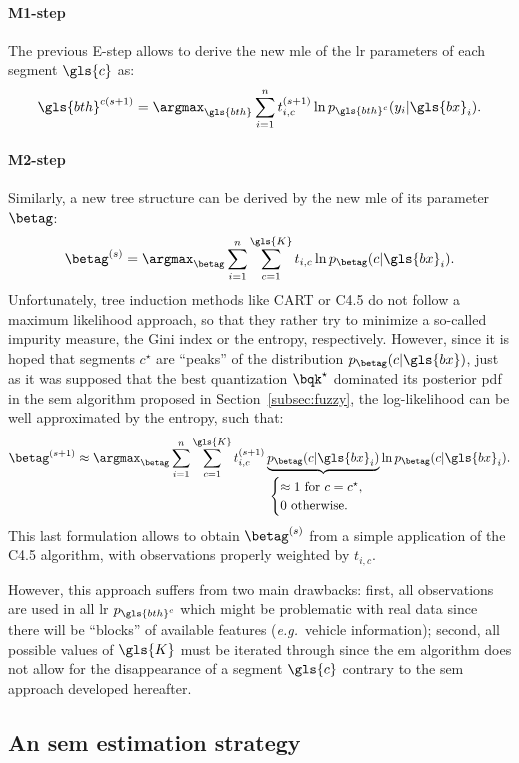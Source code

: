 \paragraph{M1-step}
The previous E-step allows to derive the new \gls{mle} of the \gls{lr} parameters of each segment $\gls{c}$ as:
\[ \gls{bth}^{c(s+1)} = \argmax_{\gls{bth}} \sum_{i=1}^n t_{i,c}^{(s+1)} \ln p_{\gls{bth}^c}(y_i | \gls{bx}_i). \]

\paragraph{M2-step}
Similarly, a new tree structure can be derived by the new \gls{mle} of its parameter $\betag$:
\[ \betag^{(s)} = \argmax_{\betag} \sum_{i=1}^n \sum_{c=1}^{\gls{K}} t_{i,c} \ln p_{\betag}( c | \gls{bx}_i). \]
Unfortunately, tree induction methods like CART or C4.5 do not follow a maximum likelihood approach, so that they rather try to minimize a so-called impurity measure, the Gini index or the entropy, respectively. However, since it is hoped that segments $c^\star$ are ``peaks'' of the distribution $p_{\betag}( c | \gls{bx})$, just as it was supposed that the best quantization $\bqk^\star$ dominated its posterior \gls{pdf} in the \gls{sem} algorithm proposed in Section~\ref{subsec:fuzzy}, the log-likelihood can be well approximated by the entropy, such that:
\[ \betag^{(s+1)} \approx \argmax_{\betag} \sum_{i=1}^n \sum_{c=1}^{\gls{K}} t_{i,c}^{(s+1)} \underbrace{p_{\betag}( c | \gls{bx}_i)}_{\begin{cases} \approx 1 \text{ for } c = c^\star, \\ 0 \text{ otherwise.} \end{cases}} \ln p_{\betag}( c | \gls{bx}_i). \]
This last formulation allows to obtain $\betag^{(s)}$ from a simple application of the C4.5 algorithm, with observations properly weighted by $t_{i,c}$.

However, this approach suffers from two main drawbacks: first, all observations are used in all \gls{lr} $p_{\gls{bth}^c}$ which might be problematic with real data since there will be ``blocks'' of available features (\textit{e.g.}\ vehicle information); second, all possible values of $\gls{K}$ must be iterated through since the \gls{em} algorithm does not allow for the disappearance of a segment $\gls{c}$ contrary to the \gls{sem} approach developed hereafter.

\subsection{An \gls{sem} estimation strategy} \label{subsec:sem}

